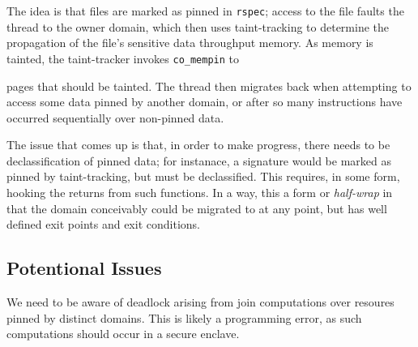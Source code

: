 The idea is that files are marked as pinned in \texttt{rspec}; access to the file faults the
thread to the owner domain, which then uses taint-tracking to determine the
propagation of the file's sensitive data throughput memory.
%
As memory is tainted, the taint-tracker invokes \texttt{co\_mempin} to 


pages that should be tainted.
%
The thread then migrates back when attempting to access some data pinned by
another domain, or after so many instructions have occurred sequentially over
non-pinned data.


The issue that comes up is that, in order to make progress, there needs to be
declassification of pinned data; for instanace, a signature would be marked as
pinned by taint-tracking, but must be declassified.
%
This requires, in some form, hooking the returns from such functions.
%
In a way, this a form or \emph{half-wrap} in that the domain conceivably could
be migrated to at any point, but has well defined exit points and exit
conditions.



\subsection{Potentional Issues}

We need to be aware of deadlock arising from join computations over resoures
pinned by distinct domains.
%
This is likely a programming error, as such computations should occur in a
secure enclave.





%
%
%



%  
%       

%    
%
%
%
% 
